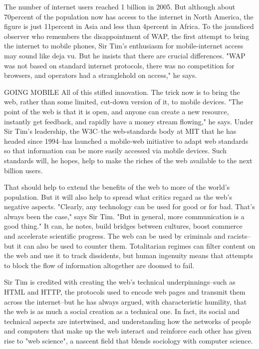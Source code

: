 The number of internet users reached 1 billion in 2005. But although about 70percent of the population now has access to the internet in North America, the figure is just 11percent in Asia and less than 4percent in Africa. To the jaundiced observer who remembers the disappointment of WAP, the first attempt to bring the internet to mobile phones, Sir Tim's enthusiasm for mobile-internet access may sound like deja vu. But he insists that there are crucial differences. "WAP was not based on standard internet protocols, there was no competition for browsers, and operators had a stranglehold on access," he says.

GOING MOBILE
All of this stifled innovation. The trick now is to bring the web, rather than some limited, cut-down version of it, to mobile devices. "The point of the web is that it is open, and anyone can create a new resource, instantly get feedback, and rapidly have a money stream flowing," he says. Under Sir Tim's leadership, the W3C--the web-standards body at MIT that he has headed since 1994--has launched a mobile-web initiative to adapt web standards so that information can be more easily accessed via mobile devices. Such standards will, he hopes, help to make the riches of the web available to the next billion users.

That should help to extend the benefits of the web to more of the world's population. But it will also help to spread what critics regard as the web's negative aspects. "Clearly, any technology can be used for good or for bad. That's always been the case," says Sir Tim. "But in general, more communication is a good thing." It can, he notes, build
bridges between cultures, boost commerce and accelerate scientific progress. The web can be used by criminals and racists--but it can also be used to counter them. Totalitarian regimes can filter content on the web and use it to track dissidents, but human ingenuity means that attempts to block the flow of information altogether are doomed to fail.

Sir Tim is credited with creating the web's technical underpinnings--such as HTML and HTTP, the protocols used to encode web pages and transmit them across the internet--but he has always argued, with characteristic humility, that the web is as much a social creation as a technical one. In fact, its social and technical aspects are intertwined, and understanding how the networks of people and computers that make up the web interact and reinforce each other has given rise to "web science", a nascent field that blends sociology with computer science.


